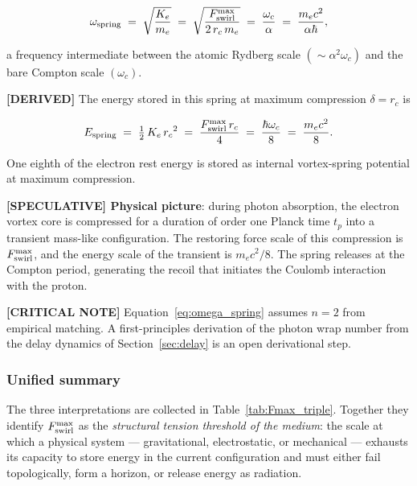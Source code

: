 \documentclass[11pt]{article}
\theoremstyle{definition}
\theoremstyle{plain}
\theoremstyle{remark}
\newcommand{\rc}{{r_c}}
\begin{document}
        \begin{align}
            \omega_{\rm spring}
            \;=\; \sqrt{\frac{K_e}{m_e}}
            \;=\; \sqrt{\frac{F_{\rm swirl}^{\max}}{2\,\rc\,m_e}}
            \;=\; \frac{\omega_c}{\alpha}
            \;=\; \frac{m_e c^2}{\alpha\hbar},
            \label{eq:omega_spring}
        \end{align}

        a frequency intermediate between the atomic Rydberg scale $(\sim\alpha^2\omega_c)$ and the bare Compton scale $(\omega_c)$.

        \textbf{[DERIVED]} The energy stored in this spring at maximum compression $\delta = \rc$ is

        \begin{align}
            E_{\rm spring}
            \;=\; \tfrac{1}{2}\,K_e\,\rc^2
            \;=\; \frac{F_{\rm swirl}^{\max}\,\rc}{4}
            \;=\; \frac{\hbar\omega_c}{8}
            \;=\; \frac{m_e c^2}{8}.
            \label{eq:Espring}
        \end{align}

        One eighth of the electron rest energy is stored as internal vortex-spring potential at maximum compression.

        \textbf{[SPECULATIVE] Physical picture}: during photon absorption, the electron vortex core is compressed for a duration of order one Planck time $t_p$ into a transient mass-like configuration. The restoring force scale of this compression is $F_{\rm swirl}^{\max}$, and the energy scale of the transient is $m_e c^2/8$. The spring releases at the Compton period, generating the recoil that initiates the Coulomb interaction with the proton.

        \textbf{[CRITICAL NOTE]} Equation~\eqref{eq:omega_spring} assumes $n=2$ from empirical matching. A first-principles derivation of the photon wrap number from the delay dynamics of Section~\ref{sec:delay} is an open derivational step.

        \subsubsection{Unified summary}

        The three interpretations are collected in Table~\ref{tab:Fmax_triple}. Together they identify $F_{\rm swirl}^{\max}$ as the \emph{structural tension threshold of the medium}: the scale at which a physical system --- gravitational, electrostatic, or mechanical --- exhausts its capacity to store energy in the current configuration and must either fail topologically, form a horizon, or release energy as radiation.
\end{document}
